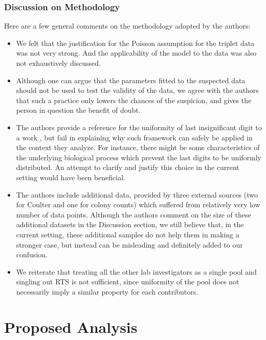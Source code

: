 \documentclass{article}
\begin{document}
\subsubsection{Discussion on Methodology}\label{discussion-of-assumptions}
Here are a few general comments on the methodology adopted by the authors:
\begin{itemize}
    \item We felt that the justification for the Poisson assumption for the triplet data was not very strong. 
    And the applicability of the model to the data was also not exhaustively discussed. 
    \item Although one can argue that the parameters fitted to the suspected data should not be used to test the validity of the data, we agree with the authors that such a practice only lowers the chances of the suspicion, and gives the person in question the benefit of doubt.
    \item The authors provide a reference for the uniformity of last insignificant digit to a work \cite{mosimann2002terminal}, but fail in explaining why such framework can safely be applied in the context they analyze. 
    For instance, there
    might be some characteristics of the underlying biological process which
    prevent the last digits to be uniformly distributed. 
    An attempt to
    clarify and justify this choice in the current setting would have been
    beneficial. 
    \item The authors include additional data, provided by three
    external sources (two for Coulter and one for colony counts) which suffered from relatively very low number of data points.
    Although the authors comment on the size of these additional datasets
    in the Discussion section, we still believe that, in the current
    setting, these additional samples do not help them in making a stronger
    case, but instead can be misleading and definitely added to our confusion.
    \item We reiterate that treating all the other lab
    investigators as a single pool and singling out RTS is not sufficient, since uniformity
    of the pool does not necessarily imply a similar property for each contributors. 

\end{itemize}



    \section{Proposed Analysis}\label{our-analysis}
\end{document}
